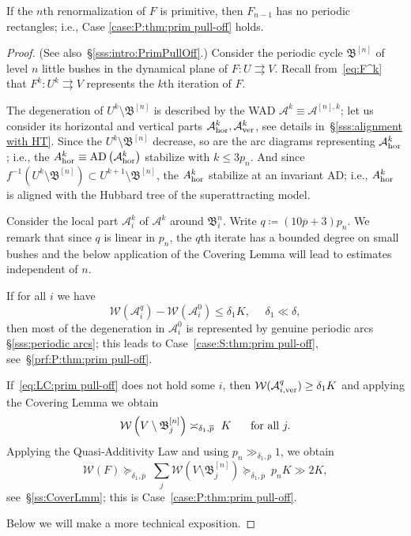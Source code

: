 \documentclass{amsart}
\newcommand{\AD}{{\operatorname{AD}}}
\newcommand{\bush}{{\mathfrak B }}
\newcommand{\bbush}{{\boldsymbol {\mathfrak B} }}
\renewcommand{\sp}{{\ \ }}
\newcommand{\1}{{\mathbb 1 }}
\newcommand{\Width}{{\mathcal W}}
\renewcommand{\AA}{{\mathcal A}}
\begin{document}
If the $n$th renormalization of $F$ is primitive, then $F_{n-1}$ has no periodic rectangles; i.e., Case \ref{case:P:thm:prim pull-off} holds.


\begin{proof}  (See also~\S\ref{sss:intro:PrimPullOff}.) Consider the periodic cycle $\bbush^{[n]}$ of level $n$ little bushes in the dynamical plane of $F\colon U\rightrightarrows V$. Recall from~\eqref{eq:F^k} that $F^k\colon U^k\rightrightarrows V$ represents the $k$th iteration of $F$.


 
 
The degeneration of $U^k\setminus \bbush^{[n]}$ is described by the WAD $ \AA^k\equiv \AA^{[n],k}$; let us consider its horizontal and vertical parts $\AA^{k}_\hor, \AA^k_\ver$, see details in~\S\ref{sss:alignment with HT}. Since the $U^k\setminus \bbush^{[n]}$ decrease, so are the arc diagrams representing $\AA^k_\hor$; i.e., the $A^k_\hor\equiv \AD \left(\AA^k_\hor\right)$ stabilize with $k\le 3p_n$. And since $f^{-1}(U^k\setminus \bbush^{[n]})\subset U^{k+1}\setminus \bbush^{[n]}$, the $A^k_{\mathrm {hor}}$ stabilize at an invariant AD; i.e., $A^k_{\mathrm {hor}}$ is aligned with the Hubbard tree of the superattracting model.


Consider the local part $\AA^k_i$ of $\AA^k$ around $\bush^n_i$. Write $q\coloneqq  (10 \overline p +3 )p_n$. We remark that since $q$ is linear in $p_n$, the $q$th iterate has a bounded degree on small bushes and the below application of the Covering Lemma will lead to estimates independent of $n$.



If for all $i$ we have
\begin{equation}
\label{eq:LC:prim pull-off} \Width(\AA^{q}_i)-\Width(\AA^0_i)\le \delta_1 K,\sp\sp \sp \delta_1\ll \delta,
\end{equation}
 then most of the degeneration in $\AA^0_i$ is represented by genuine periodic arcs \S\ref{sss:periodic arcs}; this leads to Case~\ref{case:S:thm:prim pull-off},  see~\S\ref{prf:P:thm:prim pull-off}.
 
If~\eqref{eq:LC:prim pull-off} does not hold some $i$, then $\Width(\AA^q_{i, \ver})\ge \delta_1 K$ and applying the Covering Lemma we obtain
\[\Width\left(V\setminus \bush_j^{[n]}\right)\asymp_{\delta_1, \overline p}\  K\hspace{0.5cm }\text{ for all }j.\]
Applying the Quasi-Additivity Law and using $p_n\gg_{\delta_1,\overline p} 1 $, we obtain
\[\Width(F)\succeq_{\delta_1, \overline p} \ \sum_j \Width\left(V\setminus \bush_j^{[n]}\right) \succeq_{\delta_1, \overline p}  \ p_n K\gg 2K,\]
see~\S\ref{ss:CoverLmm}; this is Case~\ref{case:P:thm:prim pull-off}.

Below we will make a more technical exposition.
\end{proof}
\end{document}
